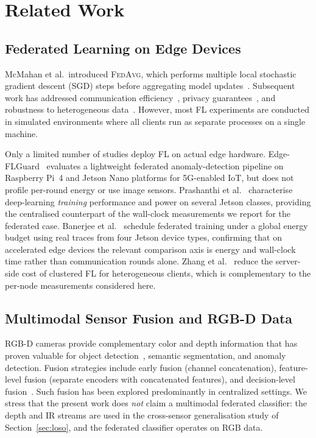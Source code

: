 \documentclass[journal]{IEEEtran}
\newcommand{\fedavg}{\textsc{FedAvg}}
\begin{document}
\section{Related Work}
\label{sec:related}

\subsection{Federated Learning on Edge Devices}

McMahan et al.\ introduced \fedavg{}, which performs multiple local stochastic gradient descent (SGD) steps before aggregating model updates~\cite{mcmahan2017fedavg}. Subsequent work has addressed communication efficiency~\cite{konevcny2016communication}, privacy guarantees~\cite{bonawitz2017practical}, and robustness to heterogeneous data~\cite{li2020fedprox}. However, most FL experiments are conducted in simulated environments where all clients run as separate processes on a single machine.

Only a limited number of studies deploy FL on actual edge hardware. Edge-FLGuard~\cite{reis2025edgeflguard} evaluates a lightweight federated anomaly-detection pipeline on Raspberry Pi~4 and Jetson Nano platforms for 5G-enabled IoT, but does not profile per-round energy or use image sensors. Prashanthi et al.~\cite{prashanthi2022jetson} characterise deep-learning \emph{training} performance and power on several Jetson classes, providing the centralised counterpart of the wall-clock measurements we report for the federated case. Banerjee et al.~\cite{banerjee2025fedjoule} schedule federated training under a global energy budget using real traces from four Jetson device types, confirming that on accelerated edge devices the relevant comparison axis is energy and wall-clock time rather than communication rounds alone. Zhang et al.~\cite{zhang2025lcfed} reduce the server-side cost of clustered FL for heterogeneous clients, which is complementary to the per-node measurements considered here.

\subsection{Multimodal Sensor Fusion and RGB-D Data}

RGB-D cameras provide complementary color and depth information that has proven valuable for object detection~\cite{gupta2014rgbd}, semantic segmentation, and anomaly detection. Fusion strategies include early fusion (channel concatenation), feature-level fusion (separate encoders with concatenated features), and decision-level fusion~\cite{ngiam2011multimodal}. Such fusion has been explored predominantly in centralized settings. We stress that the present work does \emph{not} claim a multimodal federated classifier: the depth and IR streams are used in the cross-sensor generalisation study of Section~\ref{sec:loso}, and the federated classifier operates on RGB data.
\end{document}
